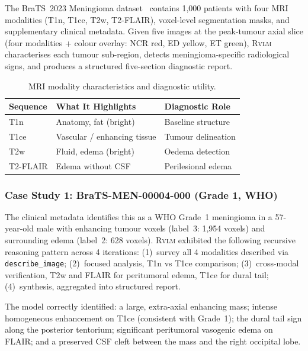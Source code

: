 \documentclass{article}
\newcommand{\RVLM}{\textsc{Rvlm}}
\begin{document}
	The BraTS~2023 Meningioma dataset~\citep{labella2023brats} contains 1,000
	patients with four MRI modalities (T1n, T1ce, T2w, T2-FLAIR), voxel-level
	segmentation masks, and supplementary clinical metadata.
	Given five images at the peak-tumour axial slice (four modalities + colour
	overlay: NCR red, ED yellow, ET green), \RVLM{} characterises each tumour
	sub-region, detects meningioma-specific radiological signs, and produces a
	structured five-section diagnostic report.
	
	\begin{table}[h]
		\centering
		\caption{MRI modality characteristics and diagnostic utility.}
		\label{tab:modalities}
		\begin{tabular}{lll}
			\toprule
			\textbf{Sequence} & \textbf{What It Highlights} & \textbf{Diagnostic Role} \\
			\midrule
			T1n     & Anatomy, fat (bright)       & Baseline structure \\
			T1ce    & Vascular / enhancing tissue  & Tumour delineation \\
			T2w     & Fluid, edema (bright)        & Oedema detection \\
			T2-FLAIR & Edema without CSF           & Perilesional edema \\
			\bottomrule
		\end{tabular}
	\end{table}
	
	\subsubsection*{Case Study 1: BraTS-MEN-00004-000 (Grade 1, WHO)}
	
	The clinical metadata identifies this as a WHO Grade~1 meningioma in a
	57-year-old male with enhancing tumour voxels (label~3: 1,954 voxels) and
	surrounding edema (label~2: 628 voxels).
	\RVLM{} exhibited the following recursive reasoning pattern across 4 iterations:
	(1)~survey all 4 modalities described via \texttt{describe\_image};
	(2)~focused analysis, T1n vs T1ce comparison;
	(3)~cross-modal verification, T2w and FLAIR for peritumoral edema, T1ce
	for dural tail;
	(4)~synthesis, aggregated into structured report.
	
	The model correctly identified: a large, extra-axial enhancing mass; intense
	homogeneous enhancement on T1ce (consistent with Grade~1); the dural tail
	sign along the posterior tentorium; significant peritumoral vasogenic edema
	on FLAIR; and a preserved CSF cleft between the mass and the right occipital
	lobe.
	
\end{document}

